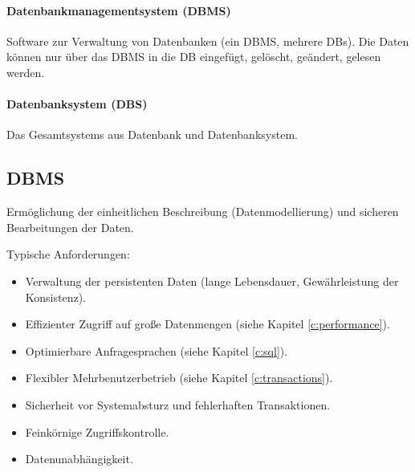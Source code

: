             \paragraph{Datenbankmanagementsystem (DBMS)}
                Software zur Verwaltung von Datenbanken (ein DBMS, mehrere DBs). Die Daten können nur über das DBMS in die DB eingefügt, gelöscht, geändert, gelesen werden.
            
            \paragraph{Datenbanksystem (DBS)}
                Das Gesamtsystems aus Datenbank und Datenbanksystem.

        \subsection{DBMS} %
            Ermöglichung der einheitlichen Beschreibung (Datenmodellierung) und sicheren Bearbeitungen der Daten.
            
            Typische Anforderungen:
            \begin{itemize}
            	\item Verwaltung der persistenten Daten (lange Lebensdauer, Gewährleistung der Konsistenz).
            	\item Effizienter Zugriff auf große Datenmengen (siehe Kapitel \ref{c:performance}).
            	\item Optimierbare Anfragesprachen (siehe Kapitel \ref{c:sql}).
            	\item Flexibler Mehrbenutzerbetrieb (siehe Kapitel \ref{c:transactions}).
            	\item Sicherheit vor Systemabsturz und fehlerhaften Transaktionen.
            	\item Feinkörnige Zugriffskontrolle.
            	\item Datenunabhängigkeit.
            \end{itemize}
            
